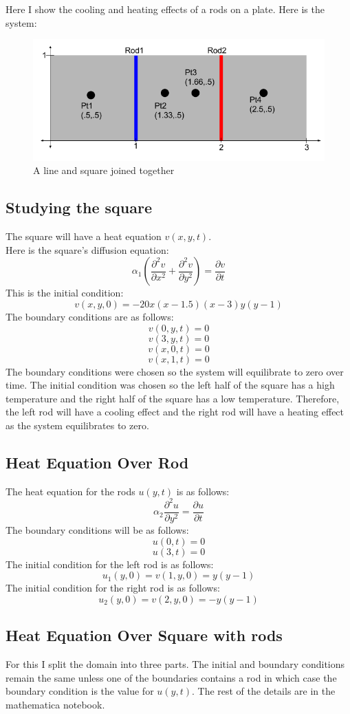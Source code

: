 \documentclass[twoside,11pt]{article}
\theoremstyle{definition}
\begin{document}
Here I show the cooling and heating effects of a rods on a plate. Here is the system:
\begin{figure}[h]
\centering
\includegraphics[width=6 in]{PlateAndTwoRods.png}
\caption{A line and square joined together}
\end{figure}

\subsection{Studying the square}

The square will have a heat equation $v(x,y,t)$. \\
Here is the square's diffusion equation:
\[
\alpha_1 (\frac{\partial^2 v}{\partial x^2} + \frac{\partial^2 v}{\partial y^2}) = \frac{\partial v}{\partial t}
\]
This is the initial condition:
\[
v(x,y,0) = -20x(x-1.5)(x-3)y(y-1)
\]
The boundary conditions are as follows:
\[
v(0,y,t)=0
\]
\[
v(3,y,t)=0
\]
\[
v(x,0,t)=0
\]
\[
v(x,1,t)=0
\]
The boundary conditions were chosen so the system will equilibrate to zero over time. The initial condition was chosen so the left half of the square has a high temperature and the right half of the square has a low temperature. Therefore, the left rod will have a cooling effect and the right rod will have a heating effect as the system equilibrates to zero. 

\newpage
\subsection{Heat Equation Over Rod}

The heat equation for the rods $u(y,t)$ is as follows:
\[
\alpha_2 \frac{\partial^2 u}{\partial y^2} = \frac{\partial u}{\partial t}
\]
The boundary conditions will be as follows:
\[
u(0,t)=0
\]
\[
u(3,t)=0
\]
The initial condition for the left rod is as follows:
\[
u_1(y,0)=v(1,y,0)=y(y-1)
\]
The initial condition for the right rod is as follows:
\[
u_2(y,0)=v(2,y,0)=-y(y-1)
\]

\subsection{Heat Equation Over Square with rods}

For this I split the domain into three parts. The initial and boundary conditions remain the same unless one of the boundaries contains a rod in which case the boundary condition is the value for $u(y,t)$. The rest of the details are in the mathematica notebook. 
\end{document}
